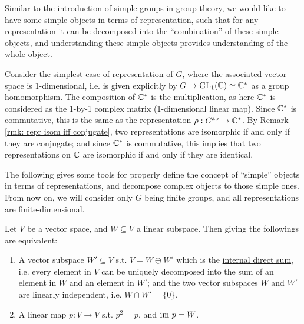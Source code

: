 \textstart
Similar to the introduction of simple groups in group theory, we would like to have some simple objects in terms of representation, such that for any representation it can be decomposed into the ``combination'' of these simple objects, and understanding these simple objects provides understanding of the whole object. 

Consider the simplest case of representation of $G$, where the associated vector space is 1-dimensional, i.e. is given explicitly by $G \to \mathrm{GL}_1(\mathbb{C}) \simeq \mathbb{C}^{\ast}$ as a group homomorphism. The composition of $\mathbb{C}^{\ast}$ is the multiplication, as here $\mathbb{C}^{\ast}$ is considered as the 1-by-1 complex matrix (1-dimensional linear map). Since $\mathbb{C}^{\ast}$ is commutative, this is the same as the representation $\bar{\rho}: G^{\mathrm{ab}} \to \mathbb{C}^{\ast}$. By Remark \ref{rmk: repr isom iff conjugate}, two representations are isomorphic if and only if they are conjugate; and since $\mathbb{C}^{\ast}$ is commutative, this implies that two representations on $\mathbb{C}$ are isomorphic if and only if they are identical.

The following gives some tools for properly define the concept of ``simple'' objects in terms of representations, and decompose complex objects to those simple ones. From now on, we will consider only $G$ being finite groups, and all representations are finite-dimensional.

\begin{parenthesis}\label{pth: equiv in v.s. for internal sum and projection}
    Let $V$ be a vector space, and $W \subseteq V$ a linear subspace. Then giving the followings are equivalent:
    \begin{enumerate}[label=\arabic*)]
        \item A vector subspace $W' \subseteq V$ s.t. $V = W \oplus W'$ which is the \underline{internal direct sum}, i.e. every element in $V$ can be uniquely decomposed into the sum of an element in $W$ and an element in $W'$; and the two vector subspaces $W$ and $W'$ are linearly independent, i.e. $W \cap W' = \{0\}$.
        \item A linear map $p: V \to V$ s.t. $p^2 = p$, and $\mathrm{im}\  p = W$.
    \end{enumerate}
\end{parenthesis}

